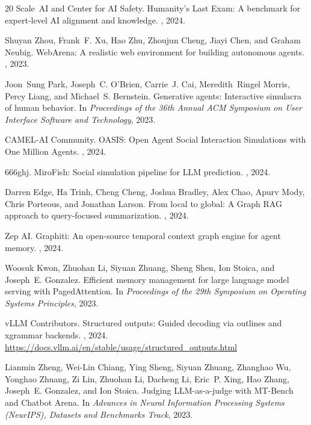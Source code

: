 \documentclass[10pt,conference]{IEEEtran}
\begin{document}
\begin{thebibliography}{20}
Scale~AI and Center for AI Safety.
\newblock Humanity's Last Exam: A benchmark for expert-level AI alignment and knowledge.
, 2024.

Shuyan Zhou, Frank~F. Xu, Hao Zhu, Zhoujun Cheng, Jiayi Chen, and Graham Neubig.
\newblock WebArena: A realistic web environment for building autonomous agents.
, 2023.

Joon~Sung Park, Joseph~C. O'Brien, Carrie~J. Cai, Meredith~Ringel Morris, Percy Liang, and Michael~S. Bernstein.
\newblock Generative agents: Interactive simulacra of human behavior.
\newblock In {\em Proceedings of the 36th Annual ACM Symposium on User Interface Software and Technology}, 2023.

CAMEL-AI Community.
\newblock OASIS: Open Agent Social Interaction Simulations with One Million Agents.
, 2024.

666ghj.
\newblock MiroFish: Social simulation pipeline for LLM prediction.
, 2024.

Darren Edge, Ha Trinh, Cheng Cheng, Joshua Bradley, Alex Chao, Apurv Mody, Chris Porteous, and Jonathan Larson.
\newblock From local to global: A Graph RAG approach to query-focused summarization.
, 2024.

Zep AI.
\newblock Graphiti: An open-source temporal context graph engine for agent memory.
, 2024.

Woosuk Kwon, Zhuohan Li, Siyuan Zhuang, Sheng Shen, Ion Stoica, and Joseph~E. Gonzalez.
\newblock Efficient memory management for large language model serving with PagedAttention.
\newblock In {\em Proceedings of the 29th Symposium on Operating Systems Principles}, 2023.

vLLM Contributors.
\newblock Structured outputs: Guided decoding via outlines and xgrammar backends.
, 2024. \url{https://docs.vllm.ai/en/stable/usage/structured_outputs.html}


Lianmin Zheng, Wei-Lin Chiang, Ying Sheng, Siyuan Zhuang, Zhanghao Wu, Yonghao Zhuang, Zi Lin, Zhuohan Li, Dacheng Li, Eric~P. Xing, Hao Zhang, Joseph~E. Gonzalez, and Ion Stoica.
\newblock Judging LLM-as-a-judge with MT-Bench and Chatbot Arena.
\newblock In {\em Advances in Neural Information Processing Systems (NeurIPS), Datasets and Benchmarks Track}, 2023.


\end{thebibliography}
\end{document}
